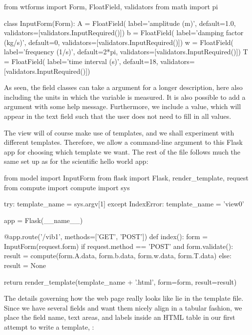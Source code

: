 \documentclass[%
oneside,                 %
final,                   %
10pt]{article}
\begin{document}
{{{{{{{{\bpypro
from wtforms import Form, FloatField, validators
from math import pi

class InputForm(Form):
    A = FloatField(
        label='amplitude (m)', default=1.0,
        validators=[validators.InputRequired()])
    b = FloatField(
        label='damping factor (kg/s)', default=0,
        validators=[validators.InputRequired()])
    w = FloatField(
        label='frequency (1/s)', default=2*pi,
        validators=[validators.InputRequired()])
    T = FloatField(
        label='time interval (s)', default=18,
        validators=[validators.InputRequired()])
\epypro

As seen, the field classes can take a  argument for a longer
description, here also including the units in which the variable is
measured. It is also possible to add a  argument with
some help message. Furthermore, we include a  value, which
will appear in the text field such that the user does not need to
fill in all values.


The view will of course make use of templates, and we shall experiment
with different templates. Therefore, we allow a command-line argument
to this Flask app for choosing which template we want. The rest of
the  file follows much the same set up as for the scientific
hello world app:

\bpypro
from model import InputForm
from flask import Flask, render_template, request
from compute import compute
import sys

try:
    template_name = sys.argv[1]
except IndexError:
    template_name = 'view0'

app = Flask(__name__)

@app.route('/vib1', methods=['GET', 'POST'])
def index():
    form = InputForm(request.form)
    if request.method == 'POST' and form.validate():
        result = compute(form.A.data, form.b.data,
                         form.w.data, form.T.data)
    else:
        result = None

    return render_template(template_name + '.html',
                           form=form, result=result)
\epypro

The details governing how the web page really looks like lie in the
template file. Since we have several fields and want them nicely
align in a tabular fashion, we place the field name, text areas,
and labels inside an HTML table in our first attempt to write a
template, :

}}}}}}}}
\end{document}
